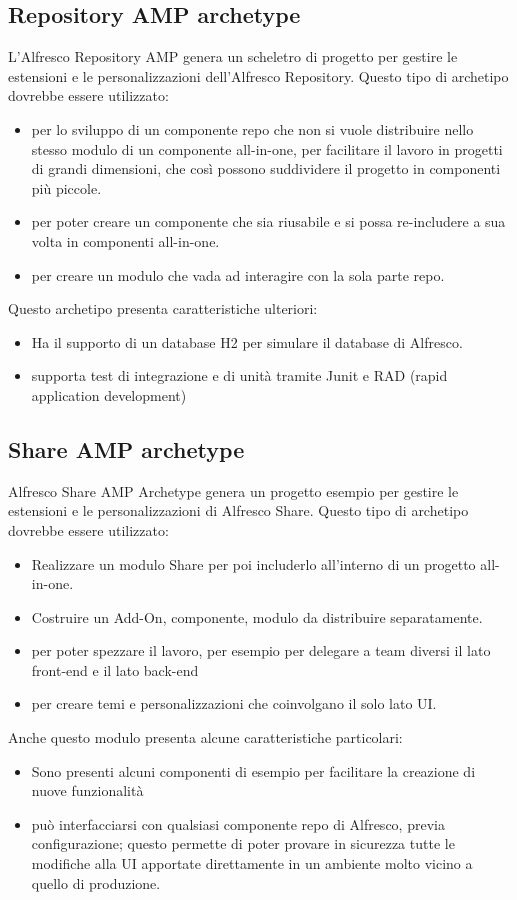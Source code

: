 \subsection{Repository AMP archetype}
L’Alfresco Repository AMP genera un scheletro di progetto per gestire le estensioni e le
personalizzazioni dell’Alfresco Repository. Questo tipo di archetipo dovrebbe essere utilizzato:
\begin{itemize}
\item  per lo sviluppo di un componente repo che non si vuole distribuire nello stesso modulo di un componente all-in-one, per facilitare il lavoro in progetti di grandi dimensioni, che così possono suddividere il progetto in componenti più piccole.
\item per poter creare un componente che sia riusabile e si possa re-includere a sua volta in componenti all-in-one.
\item per creare un modulo che vada ad interagire con la sola parte repo.
\end{itemize}
Questo archetipo presenta caratteristiche ulteriori:
\begin{itemize}
\item Ha il supporto di un database H2 per simulare il database di Alfresco.
\item supporta test di integrazione e di unità tramite Junit e RAD (rapid application development)
\end{itemize}
\subsection{Share AMP archetype}
Alfresco Share AMP Archetype genera un progetto esempio per gestire le estensioni e
le personalizzazioni di Alfresco Share. Questo tipo di archetipo dovrebbe essere utilizzato:
\begin{itemize}
\item Realizzare un modulo Share per poi includerlo all’interno di un progetto all-in-one.
\item Costruire un Add-On, componente, modulo da distribuire separatamente.
\item per poter spezzare il lavoro, per esempio per delegare a team diversi il lato front-end e il lato back-end
\item per creare temi e personalizzazioni che coinvolgano il solo lato UI.
\end{itemize}
Anche questo modulo presenta alcune caratteristiche particolari:
\begin{itemize}
\item Sono presenti alcuni componenti di esempio per facilitare la creazione di nuove funzionalità
\item può interfacciarsi con qualsiasi componente repo di Alfresco, previa configurazione; questo permette di poter provare in sicurezza tutte le modifiche alla UI apportate direttamente in un ambiente molto vicino a quello di produzione.
\end{itemize}
